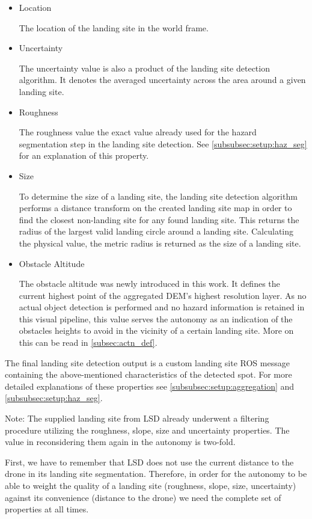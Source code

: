 \begin{itemize}
    \item Location

    The location of the landing site in the world frame.
    \item Uncertainty

    The uncertainty value is also a product of the landing site detection algorithm. It denotes the averaged uncertainty across the area around a given landing site. 
    \item Roughness

    The roughness value the exact value already used for the hazard segmentation step in the landing site detection. See \cref{subsubsec:setup:haz_seg} for an explanation of this property.
    \item Size

    To determine the size of a landing site, the landing site detection algorithm performs a distance transform on the created landing site map in order to find the closest non-landing site for any found landing site. This returns the radius of the largest valid landing circle around a landing site. Calculating the physical value, the metric radius is returned as the size of a landing site.
    \item Obstacle Altitude

    The obstacle altitude was newly introduced in this work. It defines the current highest point of the aggregated DEM's highest resolution layer. As no actual object detection is performed and no hazard information is retained in this visual pipeline, this value serves the autonomy as an indication of the obstacles heights to avoid in the vicinity of a certain landing site. More on this can be read in \cref{subsec:actn_def}.
\end{itemize}

The final landing site detection output is a custom landing site ROS message containing the above-mentioned characteristics of the detected spot. For more detailed explanations of these properties see \cref{subsubsec:setup:aggregation} and \cref{subsubsec:setup:haz_seg}.

Note: The supplied landing site from LSD already underwent a filtering procedure utilizing the roughness, slope, size and uncertainty properties. The value in reconsidering them again in the autonomy is two-fold.

First, we have to remember that LSD does not use the current distance to the drone in its landing site segmentation. Therefore, in order for the autonomy to be able to weight the quality of a landing site (roughness, slope, size, uncertainty) against its convenience (distance to the drone) we need the complete set of properties at all times.

